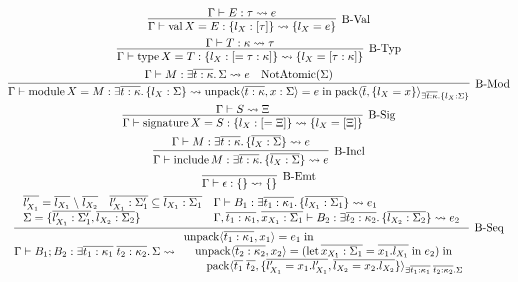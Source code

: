 \begin{gather*}
  \infer[\text{B-Val}]{\Gamma \vdash \symval X = E: \{l_X: [\tau]\} \elaborate \{l_X = e\}}{
    \Gamma \vdash E: \tau \elaborate e
  }
  \\
  \infer[\text{B-Typ}]{\Gamma \vdash \symtype X = T: \{l_X: [= \tau: \kappa]\} \elaborate \{l_X = [\tau: \kappa]\}}{
    \Gamma \vdash T: \kappa \elaborate \tau
  }
  \\
  \infer[\text{B-Mod}]{\Gamma \vdash \symmodule X = M: \exists \overline{t: \kappa}\ldotp \{l_X: \Sigma\} \elaborate \symunpack\langle \overline{t: \kappa}, x: \Sigma\rangle = e \symin \sympack\langle \overline{t}, \{l_X = x\}\rangle_{\exists \overline{t: \kappa}\ldotp \{l_X: \Sigma\}}}{
    \Gamma \vdash M: \exists \overline{t: \kappa}\ldotp \Sigma \elaborate e
    &
    \symNotAtomic(\Sigma)
  }
  \\
  \infer[\text{B-Sig}]{\Gamma \vdash \symsignature X = S: \{l_X: [= \Xi]\} \elaborate \{l_X = [\Xi]\}}{
    \Gamma \vdash S \elaborate \Xi
  }
  \\
  \infer[\text{B-Incl}]{\Gamma \vdash \syminclude M: \exists \overline{t: \kappa}\ldotp \{\overline{l_X: \Sigma}\} \elaborate e}{
    \Gamma \vdash M: \exists \overline{t: \kappa}\ldotp \{\overline{l_X: \Sigma}\} \elaborate e
  }
  \\
  \infer[\text{B-Emt}]{\Gamma \vdash \epsilon: \{\} \elaborate \{\}}{}
  \\
  \infer[\text{B-Seq}]{
    \Gamma \vdash B_1; B_2: \exists \overline{t_1: \kappa_1}\; \overline{t_2: \kappa_2}\ldotp \Sigma \elaborate
    \begin{array}{l}
      \symunpack\langle \overline{t_1: \kappa_1}, x_1\rangle = e_1 \symin \\
      \hspace{1em}\symunpack\langle \overline{t_2: \kappa_2}, x_2\rangle = (\symlet \overline{x_{X_1}: \Sigma_1}= \overline{x_1.l_{X_1}} \symin e_2) \symin \\
      \hspace{2em}\sympack\langle \overline{t_1}\; \overline{t_2}, \{\overline{l'_{X_1} = x_1.l'_{X_1}}, \overline{l_{X_2} = x_2.l_{X_2}}\}\rangle_{
        \exists \overline{t_1: \kappa_1}\; \overline{t_2: \kappa_2}\ldotp \Sigma
      }
    \end{array}
  }{
    \begin{array}{lll}
      \overline{l'_{X_1}} = \overline{l_{X_1}} \rcomplement \overline{l_{X_2}}
      &
      \overline{l'_{X_1}: \Sigma'_1} \subseteq \overline{l_{X_1}: \Sigma_1}
      &
      \Gamma \vdash B_1: \exists \overline{t_1: \kappa_1}\ldotp \{\overline{l_{X_1}: \Sigma_1}\} \elaborate e_1
      \\
      \multicolumn{2}{l}{\Sigma = \{\overline{l'_{X_1}: \Sigma'_1}, \overline{l_{X_2}: \Sigma_2}\}}
      &
      \Gamma, \overline{t_1: \kappa_1}, \overline{x_{X_1}: \Sigma_1} \vdash B_2: \exists \overline{t_2: \kappa_2}\ldotp \{\overline{l_{X_2}: \Sigma_2}\} \elaborate e_2
    \end{array}
  }
\end{gather*}

